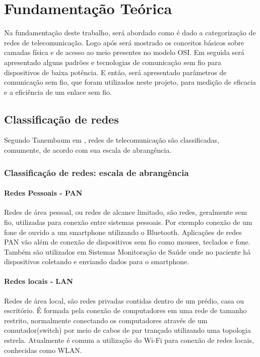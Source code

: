 \chapter{Fundamentação Teórica}
\label{fundamentacao}
Na fundamentação deste trabalho, será abordado como é dado a categorização de redes de telecomunicação. Logo após será mostrado os conceitos básicos sobre camadas física e de acesso ao meio presentes no modelo OSI. Em seguida será apresentado alguns padrões e tecnologias de comunicação sem fio para dispositivos de baixa potência. E então, será apresentado parâmetros de comunicação sem fio, que foram utilizados neste projeto, para medição de eficacia e a eficiência de um enlace sem fio.


\section{Classificação de redes}
\label{classRedes}
Segundo Tanembaum em \cite{tanembaum2011}, redes de telecomunicação são classificadas, comumente, de acordo com sua escala de abrangência.
\subsection{Classificação de redes: escala de abrangência}

\subsubsection*{Redes Pessoais - PAN}
Redes de área pessoal, ou redes de alcance limitado, são redes, geralmente sem fio, utilizadas para conexão entre sistemas pessoais. Por exemplo conexão de um fone de ouvido a um smartphone utilizando o Bluetooth. Aplicações de redes PAN vão além de conexão de dispositivos sem fio como mouses, teclados e fone. Também são utilizados em Sistemas Monitoração de Saúde onde no paciente há dispositivos coletando e enviando dados para o smartphone.

\subsubsection*{Redes locais - LAN}
Redes de área local, são redes privadas contidas dentro de um prédio, casa ou escritório. É formada pela conexão de computadores em uma rede de tamanho restrito, normalmente conectando os computadores através de um comutador(switch) por meio de cabos de par trançado utilizando uma topologia estrela. Atualmente é comum a utilização do Wi-Fi para conexão de redes locais, conhecidas como WLAN.

